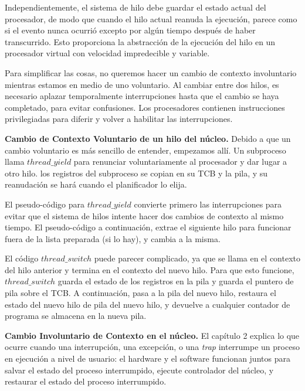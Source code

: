 \documentclass[10pt]{book}
\begin{document}
Independientemente, el sistema de hilo debe guardar el estado actual del procesador, de modo que cuando el hilo actual reanuda la ejecución, parece como si el evento nunca ocurrió excepto por algún tiempo después de haber transcurrido. Esto proporciona la abstracción de la ejecución del hilo en un procesador virtual con velocidad impredecible y variable.

Para simplificar las cosas, no queremos hacer un cambio de contexto involuntario mientras estamos en medio de uno voluntario. Al cambiar entre dos hilos, es necesario aplazar temporalmente interrupciones hasta que el cambio se haya completado, para evitar confusiones. Los procesadores contienen instrucciones privilegiadas para diferir y volver a habilitar las interrupciones.

\textbf{Cambio de Contexto Voluntario de un hilo del núcleo.} Debido a que un cambio voluntario es más sencillo de entender, empezamos allí. Un subproceso llama $thread\_ yield$ para renunciar voluntariamente al procesador y dar lugar a otro hilo. los registros del subproceso se copian en su TCB y la pila, y su reanudación se hará cuando el planificador lo elija.

El pseudo-código para $thread\_ yield$ convierte primero las interrupciones para evitar que el sistema de hilos intente hacer dos cambios de contexto al mismo tiempo. El pseudo-código a continuación, extrae el siguiente hilo para funcionar fuera de la lista preparada (si lo hay), y cambia a la misma.

El código $thread\_ switch$ puede parecer complicado, ya que se llama en el contexto del hilo anterior y termina en el contexto del nuevo hilo. Para que esto funcione, $thread\_ switch$ guarda el estado de los registros en la pila y guarda el puntero de pila sobre el TCB. A continuación, pasa a la pila del nuevo hilo, restaura el estado del nuevo hilo de pila del nuevo hilo, y devuelve a cualquier contador de programa se almacena en la nueva pila.

\textbf{Cambio Involuntario de Contexto en el núcleo.} El capítulo 2 explica lo que ocurre cuando una interrupción, una excepción, o una \textit{trap} interrumpe un proceso en ejecución a nivel de usuario: el hardware y el software funcionan juntos para salvar el estado del proceso interrumpido, ejecute controlador del núcleo, y restaurar el estado del proceso interrumpido.
\end{document}
